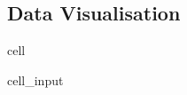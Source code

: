 \documentclass[letterpaper,10pt,english]{jupyterBook}
\begin{document}
\subsection{Data Visualisation}
\label{\detokenize{Model_evaluation:data-visualisation}}
\begin{sphinxuseclass}{cell}\begin{sphinxVerbatimInput}

\begin{sphinxuseclass}{cell_input}
\begin{sphinxVerbatim}[commandchars=\\\{\}]
   
\end{sphinxVerbatim}

\end{sphinxuseclass}\end{sphinxVerbatimInput}

\end{sphinxuseclass}
\end{document}
